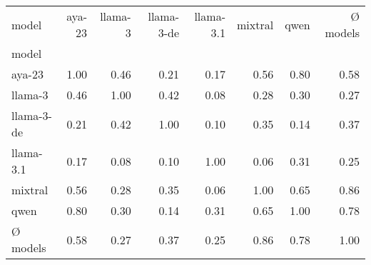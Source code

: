 \begin{tabular}{lrrrrrrr}
\toprule
model & aya-23 & llama-3 & llama-3-de & llama-3.1 & mixtral & qwen & Ø models \\
model &  &  &  &  &  &  &  \\
\midrule
aya-23 & 1.00 & 0.46 & 0.21 & 0.17 & 0.56 & 0.80 & 0.58 \\
llama-3 & 0.46 & 1.00 & 0.42 & 0.08 & 0.28 & 0.30 & 0.27 \\
llama-3-de & 0.21 & 0.42 & 1.00 & 0.10 & 0.35 & 0.14 & 0.37 \\
llama-3.1 & 0.17 & 0.08 & 0.10 & 1.00 & 0.06 & 0.31 & 0.25 \\
mixtral & 0.56 & 0.28 & 0.35 & 0.06 & 1.00 & 0.65 & 0.86 \\
qwen & 0.80 & 0.30 & 0.14 & 0.31 & 0.65 & 1.00 & 0.78 \\
Ø models & 0.58 & 0.27 & 0.37 & 0.25 & 0.86 & 0.78 & 1.00 \\
\bottomrule
\end{tabular}
